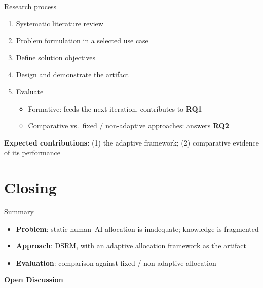 \documentclass[aspectratio=169,11pt]{beamer}
\begin{document}
\begin{frame}{Research process}
  \begin{enumerate}
    \item Systematic literature review
    \item Problem formulation in a selected use case
    \item Define solution objectives
    \item Design and demonstrate the artifact
    \item Evaluate
    \begin{itemize}
      \item Formative: feeds the next iteration, contributes to \textbf{RQ1}
      \item Comparative vs.\ fixed / non-adaptive approaches: answers \textbf{RQ2}
    \end{itemize}
  \end{enumerate}
  \vspace{0.5em}
  \textbf{Expected contributions:} (1) the adaptive framework; (2) comparative evidence of its performance
\end{frame}

\section{Closing}

\begin{frame}{Summary}
  \begin{itemize}
    \item \textbf{Problem}: static human--AI allocation is inadequate; knowledge is fragmented
    \item \textbf{Approach}: DSRM, with an adaptive allocation framework as the artifact
    \item \textbf{Evaluation}: comparison against fixed / non-adaptive allocation
  \end{itemize}
\end{frame}

\begin{frame}[plain]
  \centering
  \vfill
  {\Huge\bfseries\color{ltublue} Open Discussion}
  \vfill
\end{frame}
\end{document}
